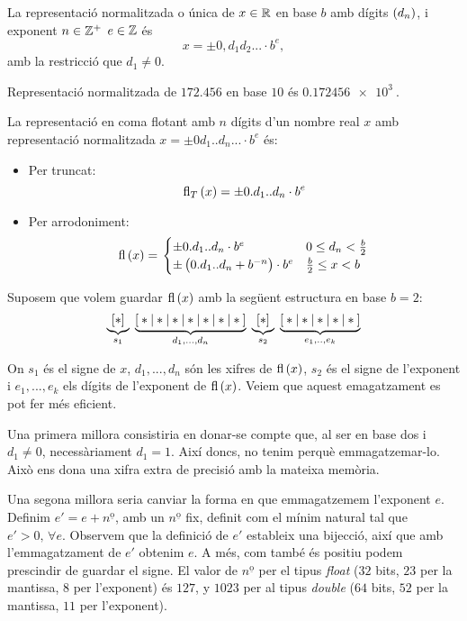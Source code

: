 \begin{defi}
    La representació normalitzada o única de $x \in \mathbb{R}$ en base $b$ amb dígits $\left(  d_n\right) $, i exponent $n \in \mathbb{Z}^{+}$  $e \in \mathbb{Z}$ és
    \[
      x = \pm 0,d_1d_2... \cdot b^e \nonumber,
    \]
    amb la restricció que $d_1 \neq 0$.
\end{defi}

\begin{example}
  Representació normalitzada de $172.456$ en base $10$ és $\SI{0.172456e3}{}$.
\end{example}

\begin{defi}
	La representació en coma flotant amb $n$ dígits d'un nombre real $x$ amb representació normalitzada $x = \pm 0d_1..d_n... \cdot b^e$ és:
	\begin{itemize}
		\item  Per truncat:
		\[
			\text{fl}_T\left( x\right)  = \pm 0.d_1..d_n \cdot b^e \nonumber
		\]
		\item Per arrodoniment:
			\[
			\text{fl}\left( x\right)  = \left.
			\begin{cases}
			\pm 0.d_1..d_n \cdot b^e & 0 \leq d_n < \frac{b}{2} \\
			\pm \left( 0.d_1..d_n + b^{-n}\right)  \cdot b^e & \frac{b}{2} \leq x < b
			\end{cases}
			\right.
			\]
	\end{itemize}
\end{defi}

\begin{obs}
  Suposem que volem guardar $\text{fl}\left( x\right) $ amb la següent estructura en base $b = 2$:
  \[
	  \underbrace{[*]}_{s_1}
	  \hspace{0.1cm}
	  \underbrace{[{}*|*|*|*|*|*|*{}]}_{d_1,...,d_n}
	  \hspace{0.1cm}
	  \underbrace{[*]}_{s_2}
	  \hspace{0.1cm}
	  \underbrace{[{}*|*|*|*|*{}]}_{e_1,..,e_k}
	  \nonumber
  \]

  On $s_1$ és el signe de $x$, $d_1,...,d_n$ són les xifres de $\text{fl}\left( x\right) $, $s_2$ és el signe de l'exponent i $e_1,...,e_k$ els dígits de l'exponent de $\text{fl}\left( x\right) $. Veiem que aquest emagatzament es pot fer més eficient.
  
  Una primera millora consistiria en donar-se compte que, al ser en base dos i $d_1 \neq 0$, necessàriament $d_1=1$. Així doncs, no tenim perquè emmagatzemar-lo. Això ens dona una xifra extra de precisió amb la mateixa memòria.
  
  Una segona millora seria canviar la forma en que emmagatzemem l'exponent $e$. Definim $e' = e + n^{\underline{\text{o}}}$, amb un $n^{\underline{\text{o}}}$ fix, definit com el mínim natural tal que $e'>0,\, \forall e$. Observem que la definició de $e'$ estableix una bijecció, així que amb l'emmagatzament de $e'$ obtenim $e$. A més, com també és positiu podem prescindir de guardar el signe.
  El valor de $n^{\underline{\text{o}}}$ per el tipus \emph{float} ($32$ bits, $23$ per la mantissa, $8$ per l'exponent) és $127$, y $1023$ per al tipus \emph{double} ($64$ bits, $52$ per la mantissa, $11$ per l'exponent).
\end{obs}
 


